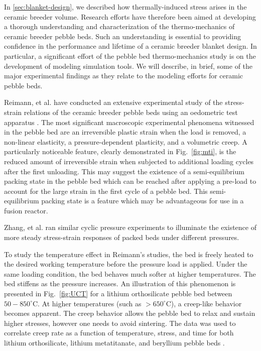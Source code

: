 In \cref{sec:blanket-design}, we described how thermally-induced stress arises in the ceramic breeder volume. Research efforts have therefore been aimed at developing a thorough understanding and characterization of the thermo-mechanics of ceramic breeder pebble beds. Such an understanding is essential to providing confidence in the performance and lifetime of a ceramic breeder blanket design. In particular, a significant effort of the pebble bed thermo-mechanics study is on the development of modeling simulation tools. We will describe, in brief, some of the major experimental findings as they relate to the modeling efforts for ceramic pebble beds.

Reimann, et al. have conducted an extensive experimental study of the stress-strain relations of the ceramic breeder pebble beds using an oedometric test apparatus \cite{Piazza2002811,Reimann:2002kl,Reimann:2003qc,Reimann:2002mi,Reimann:2001il}. The most significant macroscopic experimental phenomena witnessed in the pebble bed are an irreversible plastic strain when the load is removed, a non-linear elasticity, a pressure-dependent plasticity, and a volumetric creep.  A particularly noticeable feature, clearly demonstrated in Fig.~\ref{fig:mti}, is the reduced amount of irreversible strain when subjected to additional loading cycles after the first unloading. This may suggest the existence of a semi-equilibrium packing state in the pebble bed which can be reached after applying a pre-load to account for the large strain in the first cycle of a pebble bed. This semi-equilibrium packing state is a feature which may be advantageous for use in a fusion reactor.

Zhang, et al. ran similar cyclic pressure experiments to illuminate the existence of more steady stress-strain responses of packed beds under different pressures. 

To study the temperature effect in Reimann's studies, the bed is freely heated to the desired working temperature before the pressure load is applied. Under the same loading condition, the bed behaves much softer at higher temperatures. The bed stiffens as the pressure increases. An illustration of this phenomenon is presented in Fig.~\ref{fig:UCT} for a lithium orthosilicate pebble bed between $50-850^\circ$C. At higher temperatures (such as $> 650^\circ$C), a creep-like behavior becomes apparent. The creep behavior allows the pebble bed to relax and sustain higher stresses, however one needs to avoid sintering. The data was used to correlate creep rate as a function of temperature, stress, and time for both lithium orthosilicate, lithium metatitanate, and beryllium pebble beds \cite{Buhler:2002qf,Reimann:2001il,Reimann:2005qa}.


